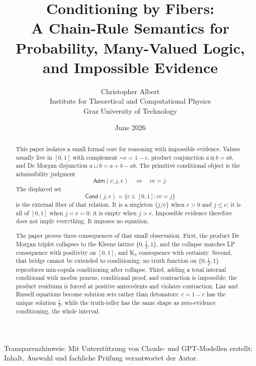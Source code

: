 \documentclass[11pt,a4paper]{article}
\title{Conditioning by Fibers:\\
\large A Chain-Rule Semantics for Probability, Many-Valued Logic, and
Impossible Evidence}
\author{Christopher Albert\\
\small Institute for Theoretical and Computational Physics\\
\small Graz University of Technology}
\date{June 2026}
\newcommand{\Cond}{\mathsf{Cond}}
\newcommand{\Adm}{\mathsf{Adm}}
\newcommand{\negc}{\mathord{\sim}}
\newcommand{\conjc}{\otimes}
\newcommand{\disjc}{\sqcup}
\newcommand{\half}{\tfrac12}
\begin{document}
\maketitle

\begin{center}
\small
Transparenzhinweis: Mit Unterstützung von Claude- und GPT-Modellen erstellt; Inhalt, Auswahl und fachliche Prüfung verantwortet der Autor.
\end{center}

\begin{abstract}
This paper isolates a small formal core for reasoning with impossible
evidence.  Values usually live in $[0,1]$ with complement
$\negc c=1-c$, product conjunction $a\conjc b=ab$, and De Morgan
disjunction $a\disjc b=a+b-ab$.  The primitive conditional object is
the admissibility judgment
\[
  \Adm(c;j,e)\quad\Longleftrightarrow\quad c e=j.
\]
The displayed set
\[
  \Cond(j,e)=\{c\in[0,1]:ce=j\}
\]
is the external fiber of that relation.  It is a singleton $\{j/e\}$
when $e>0$ and $j\le e$; it is all of $[0,1]$ when $j=e=0$; it is
empty when $j>e$.  Impossible evidence therefore does not imply
everything.  It imposes no equation.

The paper proves three consequences of that small observation.  First,
the product De Morgan triplet collapses to the Kleene lattice
$\{0,\half,1\}$, and the collapse matches LP consequence with
positivity on $[0,1]$, and K$_3$ consequence with certainty.  Second,
that bridge cannot be extended to conditioning: no truth function on
$\{0,\half,1\}$ reproduces min-copula conditioning after collapse.
Third, adding a total internal conditional with modus ponens,
conditional proof, and contraction is impossible; the product residuum
is forced at positive antecedents and violates contraction.  Liar and
Russell equations become solution sets rather than detonators:
$c=1-c$ has the unique solution $\half$, while the truth-teller has
the same shape as zero-evidence conditioning, the whole interval.


\end{abstract}
\end{document}

